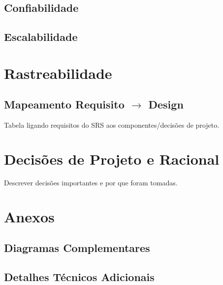 \subsection{Confiabilidade}
\subsection{Escalabilidade}

\section{Rastreabilidade}

\subsection{Mapeamento Requisito $\rightarrow$ Design}
Tabela ligando requisitos do SRS aos componentes/decisões de projeto.

\section{Decisões de Projeto e Racional}

Descrever decisões importantes e por que foram tomadas.

\section{Anexos}

\subsection{Diagramas Complementares}
\subsection{Detalhes Técnicos Adicionais}